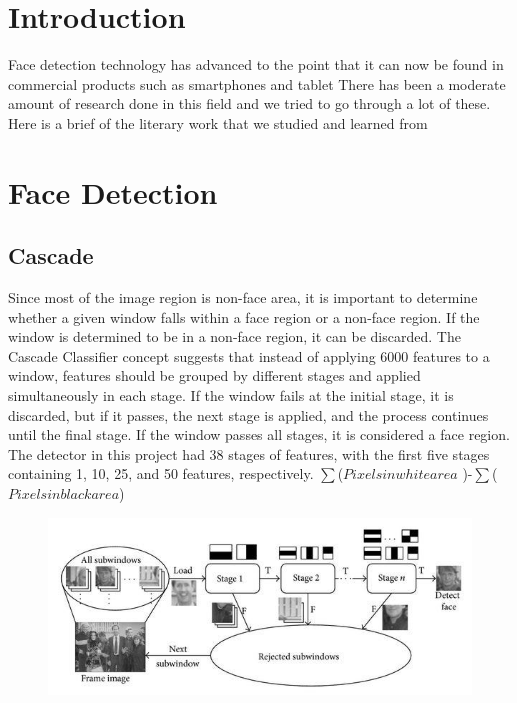 \section{Introduction}
Face detection technology has advanced to the point that it can now be found in commercial products such as smartphones and tablet
There has been a moderate amount of research done in this field and we tried to go
through a lot of these. Here is a brief of the literary work that we studied and learned from

\section{Face Detection}
\subsection{Cascade}
Since most of the image region is non-face area, it is important to determine whether a given window falls within a face region or a non-face region. If the window is determined to be in a non-face region, it can be discarded. The Cascade Classifier concept suggests that instead of applying 6000 features to a window, features should be grouped by different stages and applied simultaneously in each stage. If the window fails at the initial stage, it is discarded, but if it passes, the next stage is applied, and the process continues until the final stage. If the window passes all stages, it is considered a face region. The detector in this project had 38 stages of features, with the first five stages containing 1, 10, 25, and 50 features, respectively.
\newline  
$  \sum $($Pixels in white area$ )-$\sum$($Pixels in black area$)
\begin{figure}[!htb]
    \centering
    \includegraphics[width=\linewidth,height=0.201\linewidth]{Figures/Ch01/cascade.png}
    \label{figure:cascade}
    \end{figure}
\clearpage
